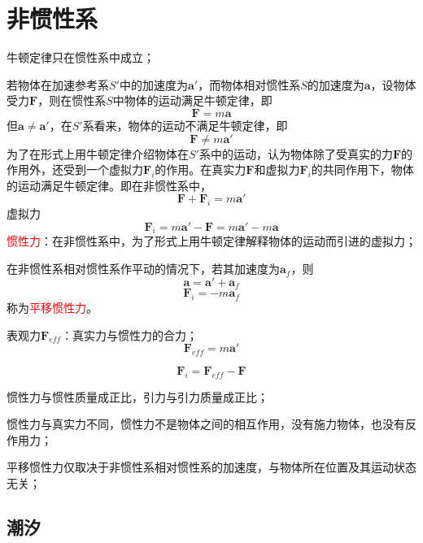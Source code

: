 \documentclass[12pt,a4paper]{article}
\renewcommand{\vec}[1]{\boldsymbol{#1}}
\begin{document}
\section{非惯性系}
牛顿定律只在惯性系中成立；

若物体在加速参考系$S'$中的加速度为$\vec{a}'$，而物体相对惯性系$S$的加速度为$\vec{a}$，设物体受力$\vec{F}$，则在惯性系$S$中物体的运动满足牛顿定律，即
\begin{equation}
\vec{F} = m\vec{a}
\end{equation}
但$\vec{a} \neq \vec{a}'$，在$S'$系看来，物体的运动不满足牛顿定律，即
\begin{equation}
\vec{F} \neq m\vec{a}'
\end{equation}
为了在形式上用牛顿定律介绍物体在$S'$系中的运动，认为物体除了受真实的力$\vec{F}$的作用外，还受到一个虚拟力$\vec{F}_i$的作用。在真实力$\vec{F}$和虚拟力$\vec{F}_i$的共同作用下，物体的运动满足牛顿定律。即在非惯性系中，
\begin{equation}
\vec{F} +\vec{F}_i = m\vec{a}'
\end{equation}
虚拟力
\begin{equation}
\vec{F}_i = m\vec{a}' -\vec{F}  = m\vec{a}' -m\vec{a}
\end{equation}
\textcolor{red}{惯性力}：在非惯性系中，为了形式上用牛顿定律解释物体的运动而引进的虚拟力；

在非惯性系相对惯性系作平动的情况下，若其加速度为$\vec{a}_f$，则
\begin{equation}
\vec{a} = \vec{a}' +\vec{a}_f
\end{equation}
\begin{equation}
\vec{F}_i = -m\vec{a}_f
\end{equation}
称为\textcolor{red}{平移惯性力}。

表观力$\vec{F}_{eff}$：真实力与惯性力的合力；
\begin{equation}
\vec{F}_{eff} = m\vec{a}'
\end{equation}

\begin{equation}
\vec{F}_i = \vec{F}_{eff} -\vec{F}
\end{equation}

惯性力与惯性质量成正比，引力与引力质量成正比；

惯性力与真实力不同，惯性力不是物体之间的相互作用，没有施力物体，也没有反作用力；

平移惯性力仅取决于非惯性系相对惯性系的加速度，与物体所在位置及其运动状态无关；

\subsection{潮汐}
\end{document}
